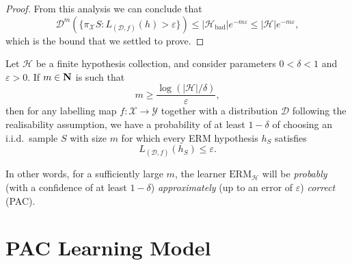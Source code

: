 \begin{proof}
    From this analysis we can conclude that
    \[
        \mathcal{D}^m(\{\pi_{\mathcal{X}} S \colon L_{(\mathcal{D}, f)}(h) > \varepsilon\})
        \leq |\mathcal{H}_{\text{bad}}| e^{-m \varepsilon}
        \leq |\mathcal{H}| e^{-m \varepsilon},
    \]
    which is the bound that we settled to prove.
\end{proof}

\begin{corollary}
    \label{cor:finite-hypothesis-pac-learnability}
    Let \(\mathcal{H}\) be a finite hypothesis collection, and consider parameters
    \(0 < \delta < 1\) and \(\varepsilon > 0\). If \(m \in \mathbf{N}\) is such that
    \[
        m \geq \frac{\log(|\mathcal{H}| / \delta)}{\varepsilon},
    \]
    then for any labelling map \(f: \mathcal{X} \to \mathcal{Y}\) together with a
    distribution \(\mathcal{D}\) following the realisability assumption, we have a
    probability of at least \(1 - \delta\) of choosing an i.i.d.~sample \(S\) with
    size \(m\) for which every ERM hypothesis \(h_S\) satisfies
    \[
        L_{(\mathcal{D}, f)}(h_S) \leq \varepsilon.
    \]

    In other words, for a sufficiently large \(m\), the learner
    \(\text{ERM}_{\mathcal{H}}\) will be \emph{probably} (with a confidence of at
    least \(1 - \delta\)) \emph{approximately} (up to an error of \(\varepsilon\))
    \emph{correct} (PAC).
\end{corollary}

\section{PAC Learning Model}

